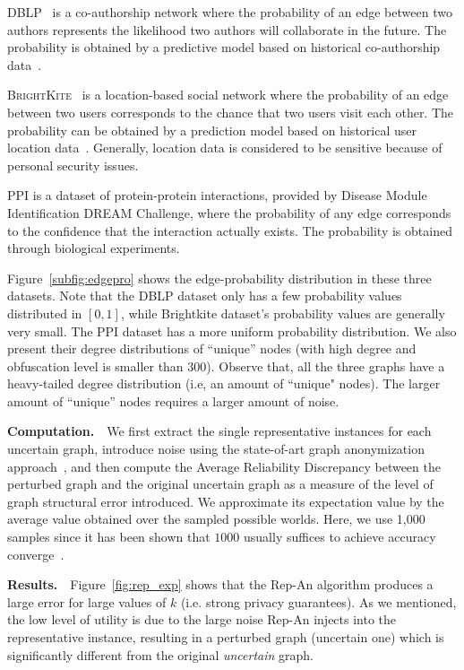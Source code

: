 \textsc{DBLP}~\cite{dblps} is a co-authorship network where the probability of an edge between two authors represents the likelihood two authors will collaborate in the future. The probability is obtained by a predictive model based on historical co-authorship data~\cite{Jin_Distance_2011}. 

\textsc{BrightKite}~\cite{snapnets} is a location-based social network where the probability of an edge between two users corresponds to the chance that two users visit each other. The probability can be obtained by a prediction model based on historical user location data~\cite{Cho_Friendship_2011}. Generally, location data is considered to be sensitive because of personal security issues. 

\textsc{PPI} is a dataset of protein-protein interactions, provided by Disease Module Identification DREAM Challenge, where the probability of any edge corresponds to the confidence that the interaction actually exists.
The probability is obtained through biological experiments.

Figure~\ref{subfig:edgepro} shows the edge-probability distribution in these three datasets. 
Note that the DBLP dataset only has a few probability values distributed in $[0,1]$, while Brightkite dataset's probability values are generally very small. The PPI dataset has a more uniform probability distribution. 
We also present their degree distributions of ``unique'' nodes (with high degree and obfuscation level is smaller than $300$). Observe that, all the three graphs have a heavy-tailed degree distribution (i.e, an amount of ``unique" nodes). The larger amount of ``unique'' nodes requires a larger amount of noise.


\textbf{Computation.}~~We first extract the single representative instances for each uncertain graph, introduce noise using the state-of-art graph anonymization approach~\cite{Boldi_Injecting_2012}, and then compute the Average Reliability Discrepancy between the perturbed graph and the original uncertain graph as a measure of the level of graph structural error introduced. We approximate its expectation value by the average value obtained over the sampled possible worlds. Here, we use 1,000 samples since it has been shown that $1000$ usually suffices to achieve accuracy converge~\cite{Potamias_K_2010}.

\textbf{Results.}~~Figure~\ref{fig:rep_exp} shows that the Rep-An algorithm produces a large error for large values of $k$ (i.e. strong privacy guarantees). As we mentioned, the low level of utility is due to the large noise Rep-An injects into the representative instance, resulting in a perturbed graph (uncertain one) which is significantly different from the original \emph{uncertain} graph. 

